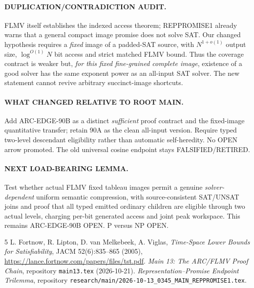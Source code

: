 \documentclass[11pt]{article}
\begin{document}
\paragraph{DUPLICATION/CONTRADICTION AUDIT.}
FLMV itself establishes the indexed access theorem; REPPROMISE1 already warns that a general compact image promise does not solve SAT. Our changed hypothesis requires a \emph{fixed} image of a padded-SAT source, with \(N^{1+o(1)}\) output size, \(\log^{O(1)}N\) bit access and strict matched FLMV bound. Thus the coverage contract is weaker but, \emph{for this fixed fine-grained complete image}, existence of a good solver has the same exponent power as an all-input SAT solver. The new statement cannot revive arbitrary succinct-image shortcuts.
\paragraph{WHAT CHANGED RELATIVE TO ROOT MAIN.}
Add ARC-EDGE-90B as a distinct \emph{sufficient} proof contract and the fixed-image quantitative transfer; retain 90A as the clean all-input version. Require typed two-level descendant eligibility rather than automatic self-heredity. No OPEN arrow promoted. The old universal cosine endpoint stays FALSIFIED/RETIRED.
\paragraph{NEXT LOAD-BEARING LEMMA.}
Test whether actual FLMV fixed tableau images permit a genuine \emph{solver-dependent} uniform semantic compression, with source-consistent SAT/UNSAT joins and proof that all typed emitted ordinary children are eligible through two actual levels, charging per-bit generated access and joint peak workspace. This remains ARC-EDGE-90B OPEN. P versus NP OPEN.
\begin{thebibliography}{5}
 L. Fortnow, R. Lipton, D. van Melkebeek, A. Viglas, \emph{Time-Space Lower Bounds for Satisfiability}, JACM 52(6):835--865 (2005), \url{https://lance.fortnow.com/papers/files/tst.pdf}.
 \emph{Main 13: The ARC/FLMV Proof Chain}, repository \texttt{main13.tex} (2026-10-21).
 \emph{Representation--Promise Endpoint Trilemma}, repository \texttt{research/main/2026-10-13\_0345\_MAIN\_REPPROMISE1.tex}.
\end{thebibliography}
\end{document}
